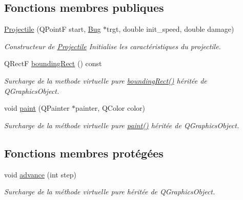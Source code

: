 \subsection*{Fonctions membres publiques}
\begin{DoxyCompactItemize}
\item 
\hyperlink{classProjectile_adb1e35e75922feb87c3391f549d3274f}{Projectile} (QPointF start, \hyperlink{classBug}{Bug} $\ast$trgt, double init\_\-speed, double damage)
\begin{DoxyCompactList}\small\item\em Constructeur de \hyperlink{classProjectile}{Projectile} Initialise les caractéristiques du projectile. \end{DoxyCompactList}\item 
QRectF \hyperlink{classProjectile_a0e0b18909c9c154404384707c6515802}{boundingRect} () const 
\begin{DoxyCompactList}\small\item\em Surcharge de la methode virtuelle pure \hyperlink{classProjectile_a0e0b18909c9c154404384707c6515802}{boundingRect()} héritée de QGraphicsObject. \end{DoxyCompactList}\item 
void \hyperlink{classProjectile_aef0d6ffcea7620988cf5446d0c1133fa}{paint} (QPainter $\ast$painter, QColor color)
\begin{DoxyCompactList}\small\item\em Surcharge de la méthode virtuelle pure \hyperlink{classProjectile_aef0d6ffcea7620988cf5446d0c1133fa}{paint()} héritée de QGraphicsObject. \end{DoxyCompactList}\end{DoxyCompactItemize}
\subsection*{Fonctions membres protégées}
\begin{DoxyCompactItemize}
\item 
void \hyperlink{classProjectile_a8e3b4bae49558a0febfce8c1accea72d}{advance} (int step)
\begin{DoxyCompactList}\small\item\em Surcharge de la méthode virtuelle pure héritée de QGraphicsObject. \end{DoxyCompactList}\end{DoxyCompactItemize}

